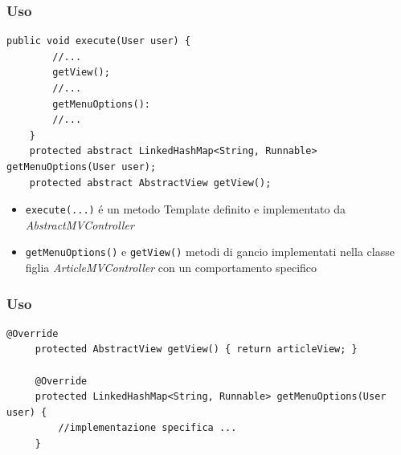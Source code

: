 \begin{frame} [fragile]
    \frametitle{Uso}
    \begin{lstlisting}[autogobble, title={\texttt{AbstractMVController.java}}, morekeywords={getView, getMenuOptions}]
    public void execute(User user) {
        //...
        getView();
        //...
        getMenuOptions():
        //...
    }
    protected abstract LinkedHashMap<String, Runnable> getMenuOptions(User user);
    protected abstract AbstractView getView();
    \end{lstlisting}
    \begin{itemize}
        \item \texttt{execute(...)} é un metodo Template definito e implementato da \emph{AbstractMVController}
        \item \texttt{getMenuOptions()} e \texttt{getView()} metodi di gancio implementati nella classe figlia \emph{ArticleMVController} con un comportamento specifico
    \end{itemize}
\end{frame}

\begin{frame} [fragile]
 \frametitle{Uso}
   \begin{lstlisting}[autogobble, title={\texttt{ArticleMVController.java}}]
     @Override
     protected AbstractView getView() { return articleView; }

     @Override
     protected LinkedHashMap<String, Runnable> getMenuOptions(User user) {
         //implementazione specifica ...
     }
   \end{lstlisting}
\end{frame}
